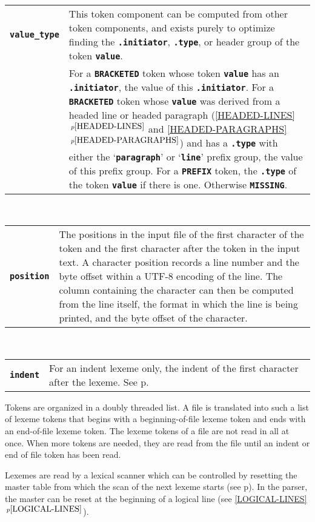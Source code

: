 \documentclass[12pt]{article}
\makeatletter
\newcommand{\TT}[1]{{\tt \bfseries #1}}
\newcommand{\ttmkey}[2]{\TT{#1}\index{#1@\TT{#1}!#2}}
\newcommand{\itemref}[1]{\ref{#1}$\,^{p\pageref{#1}}$}
\newcommand{\pagref}[1]{p\pageref{#1}}
\newenvironment{indpar}[1][0.3in]%
	{\begin{list}{}%
		     {\setlength{\itemsep}{0in}%
		      \setlength{\topsep}{0in}%
		      \setlength{\parsep}{1ex}%
		      \setlength{\labelwidth}{#1}%
		      \setlength{\leftmargin}{#1}%
		      \addtolength{\leftmargin}{\labelsep}}%
	 \item}%
	{\end{list}}
\makeatother
\begin{document}
\begin{indpar}
\begin{tabular}{p{1in}p{4.5in}}
\end{tabular}
\\[1ex]
\begin{tabular}{p{1in}p{4.5in}}
\ttmkey{value\_type}{of token}
		& This token component can be computed from other
		  token components, and exists purely to optimize finding
		  the \TT{.initiator}, \TT{.type}, or header group
		  of the token \TT{value}.
\\[1ex]
		& For a \TT{BRACKETED} token whose
		  token \TT{value} has an \TT{.ini\-tiator},
		  the value of this \TT{.initiator}.  For a
		  \TT{BRACKETED} token whose \TT{value} was derived
		  from a headed line or headed paragraph
		  (\itemref{HEADED-LINES} and \itemref{HEADED-PARAGRAPHS})
		  and has a \TT{.type}
		  with either the `\TT{paragraph}' or `\TT{line}'
		  prefix group, the value of this prefix group.
		  For a \TT{PREFIX} token, the \TT{.type} of the token
		  \TT{value} if there is one.  Otherwise \TT{MISSING}.
\end{tabular}
\\[1ex]
\begin{tabular}{p{1in}p{4.5in}}
\ttmkey{position}{of token}
		& The positions in the input file of
                  the first character of the token
		  and the first character after the token in the
		  input text.  A character position records a line number
		  and the byte offset within a UTF-8 encoding
		  of the line.  The column containing the character
		  can then be computed from the line itself, the format
		  in which the line is being printed, and the
		  byte offset of the character.
\end{tabular}
\\[1ex]
\begin{tabular}{p{1in}p{4.5in}}
\ttmkey{indent}{of token}
	        & For an indent lexeme only,
		  the indent of the first character after the lexeme.  See
		  \pagref{INDENT-OF-CHARACTER}.
\end{tabular}
\end{indpar}

Tokens are organized in a doubly threaded list.  A file is translated into
such a list of lexeme tokens that begins with a beginning-of-file lexeme token
and ends with an end-of-file lexeme token.
The lexeme tokens of a file are not read in all at once.  When more tokens
are needed, they are read from the file until an indent or end of file
token has been read.

Lexemes are read by a lexical scanner which can be controlled by
resetting the master table from which the scan of the next lexeme
starts (see \pagref{MASTER-TABLE}).  In the parser, the master
can be reset at the beginning of a logical line (see \itemref{LOGICAL-LINES}).
\end{document}
